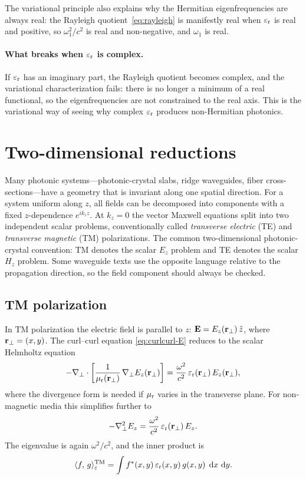 The variational principle also explains why the Hermitian eigenfrequencies
are always real: the Rayleigh quotient~\eqref{eq:rayleigh} is manifestly
real when $\varepsilon_{\mathrm{r}}$ is real and positive, so $\omega_1^2/c^2$ is real and
non-negative, and $\omega_1$ is real.

\paragraph{What breaks when $\varepsilon_{\mathrm{r}}$ is complex.}
If $\varepsilon_{\mathrm{r}}$ has an imaginary part, the Rayleigh quotient becomes complex,
and the variational characterization fails: there is no longer a minimum
of a real functional, so the eigenfrequencies are not constrained to the
real axis. This is the variational way of seeing why complex $\varepsilon_{\mathrm{r}}$
produces non-Hermitian photonics.


\section{Two-dimensional reductions}
\label{sec:2d-reductions}

Many photonic systems---photonic-crystal slabs, ridge waveguides, fiber
cross-sections---have a geometry that is invariant along one spatial
direction. For a system uniform along $z$, all fields can be decomposed
into components with a fixed $z$-dependence $e^{ik_z z}$. At $k_z = 0$
the vector Maxwell equations split into two independent scalar problems,
conventionally called \emph{transverse electric} (TE) and
\emph{transverse magnetic} (TM) polarizations. The common
two-dimensional photonic-crystal convention: TM denotes the scalar
$E_z$ problem and TE denotes the scalar $H_z$ problem. Some waveguide
texts use the opposite language relative to the propagation direction, so
the field component should always be checked.

\subsection{TM polarization}
\label{ssec:tm}

In TM polarization the electric field is parallel to $z$:
$\mathbf{E} = E_z(\mathbf{r}_\perp)\,\hat{z}$, where $\mathbf{r}_\perp = (x,y)$.
The curl--curl equation \eqref{eq:curlcurl-E} reduces to the scalar
Helmholtz equation
\begin{equation}
 -\nabla_\perp\cdot
 \left[\frac{1}{\mu_{\mathrm{r}}(\mathbf{r}_\perp)}\,\nabla_\perp E_z(\mathbf{r}_\perp)\right]
 = \frac{\omega^2}{c^2}\,\varepsilon_{\mathrm{r}}(\mathbf{r}_\perp)\,E_z(\mathbf{r}_\perp),
 \label{eq:tm-helmholtz}
\end{equation}
where the divergence form is needed if $\mu_{\mathrm{r}}$ varies in the transverse
plane. For non-magnetic media this simplifies further to
\begin{equation}
 -\nabla_\perp^2 E_z
 = \frac{\omega^2}{c^2}\,\varepsilon_{\mathrm{r}}(\mathbf{r}_\perp)\,E_z.
 \label{eq:tm-simple}
\end{equation}
The eigenvalue is again $\omega^2/c^2$, and the inner product is
\begin{equation}
 \langle f,\,g\rangle_{\varepsilon}^{\mathrm{TM}}
 = \int f^*(x,y)\,\varepsilon_{\mathrm{r}}(x,y)\,g(x,y)\;\mathop{}\!\mathrm{d} x\,\mathop{}\!\mathrm{d} y.
 \label{eq:tm-inner}
\end{equation}


